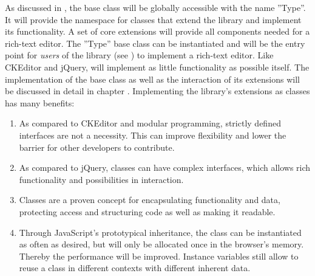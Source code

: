 


As discussed in , the base class will be globally accessible with the name ''Type''. It will provide the namespace for classes that extend the library and implement its functionality. A set of core extensions will provide all components needed for a rich-text editor. The ''Type'' base class can be instantiated and will be the entry point for \textit{users} of the library (see ) to implement a rich-text editor. Like CKEditor and jQuery, will implement as little functionality as possible itself. The implementation of the base class as well as the interaction of its extensions will be discussed in detail in chapter . Implementing the library's extensions as classes has many benefits:


\begin{enumerate}
\item As compared to CKEditor and modular programming, strictly defined interfaces are not a necessity. This can improve flexibility and lower the barrier for other developers to contribute. %
\item As compared to jQuery, classes can have complex interfaces, which allows rich functionality and possibilities in interaction.
\item Classes are a proven concept for encapsulating functionality and data, protecting access and structuring code as well as making it readable.
\item Through JavaScript's prototypical inheritance, the class can be instantiated as often as desired, but will only be allocated once in the browser's memory. Thereby the performance will be improved. Instance variables still allow to reuse a class in different contexts with different inherent data. %
\end{enumerate}

